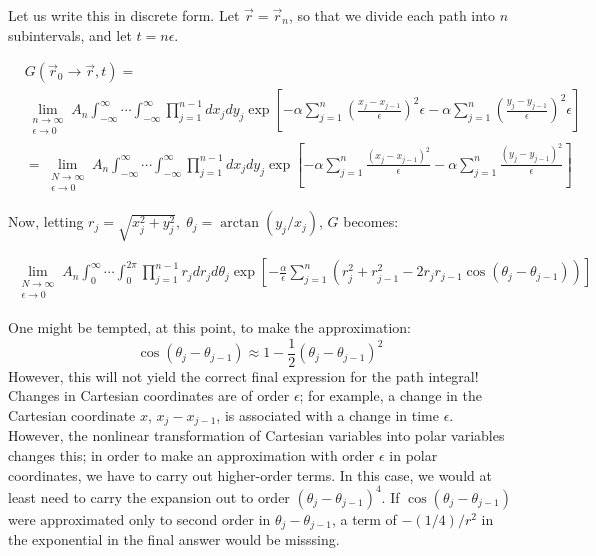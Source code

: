 \documentclass[12pt,a4paper]{article}
\begin{document}
Let us write this in discrete form. Let $\vec{r}=\vec{r}_n$, so that we divide each path into $n$ subintervals, and let $t=n\epsilon$.

\begin{align*}
&G(\vec{r}_0 \rightarrow \vec{r}, t) = \\
&\lim_{\substack{n\rightarrow\infty\\ \epsilon \rightarrow 0}} A_n\int_{-\infty}^{\infty}\cdots\int_{-\infty}^{\infty}\prod_{j=1}^{n-1} dx_j dy_j \exp{\left[-\alpha\sum_{j=1}^{n}\left(\frac{x_j-x_{j-1}}{\epsilon}\right)^2\epsilon -\alpha \sum_{j=1}^{n}\left(\frac{y_j-y_{j-1}}{\epsilon}\right)^2\epsilon\right]} \\
&= \lim_{\substack{N\rightarrow\infty\\ \epsilon \rightarrow 0}} A_n\int_{-\infty}^{\infty}\cdots\int_{-\infty}^{\infty}\prod_{j=1}^{n-1} dx_j dy_j \exp{\left[-\alpha\sum_{j=1}^{n}\frac{(x_j-x_{j-1})^2}{\epsilon} - \alpha\sum_{j=1}^{n}\frac{(y_j-y_{j-1})^2}{\epsilon}\right]}
\end{align*}

Now, letting $r_j = \sqrt{x_j^2+y_j^2}, \;\theta_j = \arctan{(y_j/x_j)}$,  $G$ becomes:

\begin{align*}
\lim_{\substack{N\rightarrow\infty\\ \epsilon \rightarrow 0}} A_n\int_{0}^{\infty}\cdots\int_{0}^{2\pi}\prod_{j=1}^{n-1} r_j dr_j d\theta_j \exp{\left[-\frac{\alpha}{\epsilon}\sum_{j=1}^{n}(r_j^2+r_{j-1}^2-2r_jr_{j-1}\cos(\theta_j-\theta_{j-1}))\right]}
\end{align*}

One might be tempted, at this point, to make the approximation:
\[
\cos(\theta_j-\theta_{j-1}) \approx 1-\frac{1}{2}(\theta_j - \theta_{j-1})^2
\]
However, this will not yield the correct final expression for the path integral! Changes in Cartesian coordinates are of order $\epsilon$; for example, a change in the Cartesian coordinate $x$, $x_j-x_{j-1}$, is associated with a change in time $\epsilon$. However, the nonlinear transformation of Cartesian variables into polar variables changes this; in order to make an approximation with order $\epsilon$ in polar coordinates, we have to carry out higher-order terms. In this case, we would at least need to carry the expansion out to order $(\theta_j-\theta_{j-1})^4$. If $\cos(\theta_j-\theta_{j-1})$ were approximated only to second order in $\theta_j-\theta_{j-1}$, a term of $-(1/4)/r^2$ in the exponential in the final answer would be misssing.\\
\end{document}
